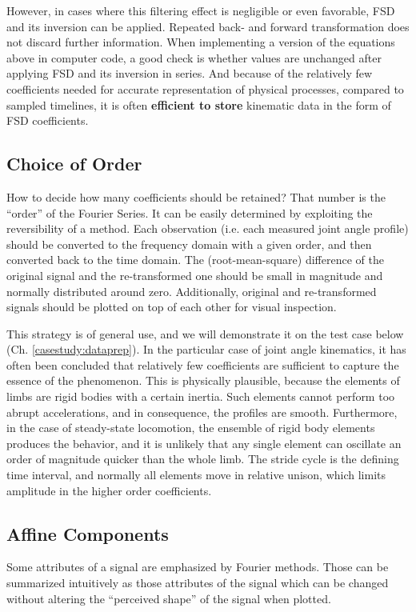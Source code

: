However, in cases where this filtering effect is negligible or even favorable, FSD and its inversion can be applied.
Repeated back- and forward transformation does not discard further information.
When implementing a version of the equations above in computer code, a good check is whether values are unchanged after applying FSD and its inversion in series.
And because of the relatively few coefficients needed for accurate representation of physical processes, compared to sampled timelines, it is often \textbf{efficient to store} kinematic data in the form of FSD coefficients.

\subsection{Choice of Order}
\label{sec:org6dc786a}
How to decide how many coefficients should be retained?
That number is the ``order'' of the Fourier Series.
It can be easily determined by exploiting the reversibility of a method.
Each observation (i.e. each measured joint angle profile) should be converted to the frequency domain with a given order, and then converted back to the time domain.
The (root-mean-square) difference of the original signal and the re-transformed one should be small in magnitude and normally distributed around zero.
Additionally, original and re-transformed signals should be plotted on top of each other for visual inspection.


This strategy is of general use, and we will demonstrate it on the test case below (Ch. \ref{casestudy:dataprep}).
In the particular case of joint angle kinematics, it has often been concluded that relatively few coefficients are sufficient to capture the essence of the phenomenon.
This is physically plausible, because the elements of limbs are rigid bodies with a certain inertia.
Such elements cannot perform too abrupt accelerations, and in consequence, the profiles are smooth.
Furthermore, in the case of steady-state locomotion, the ensemble of rigid body elements produces the behavior, and it is unlikely that any single element can oscillate an order of magnitude quicker than the whole limb.
The stride cycle is the defining time interval, and normally all elements move in relative unison, which limits amplitude in the higher order coefficients.


\subsection{Affine Components}
\label{sec:org9f14a52}
Some attributes of a signal are emphasized by Fourier methods.
Those can be summarized intuitively as those attributes of the signal which can be changed without altering the ``perceived shape'' of the signal when plotted.

